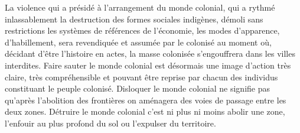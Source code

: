 \documentclass[french,twoside]{book} %
\begin{document}
 La violence qui a présidé à l’arrangement du monde colonial, qui a rythmé inlassablement la destruction des formes sociales indigènes, démoli sans restrictions les systèmes de références de l’économie, les modes d’apparence, d’habillement, sera revendiquée et assumée par le colonisé au moment où, décidant d’être l’histoire en actes, la masse colonisée s’engouffrera dans les villes interdites. Faire sauter le monde colonial est désormais une image d’action très claire, très compréhensible et pouvant être reprise par chacun des individus constituant le peuple colonisé. Disloquer le monde colonial ne signifie pas qu’après l’abolition des frontières on aménagera des voies de passage entre les deux zones. Détruire le monde colonial c’est ni plus ni moins abolir une zone, l’enfouir au plus profond du sol ou l’expulser du territoire.\par
\bigbreak
\end{document}
